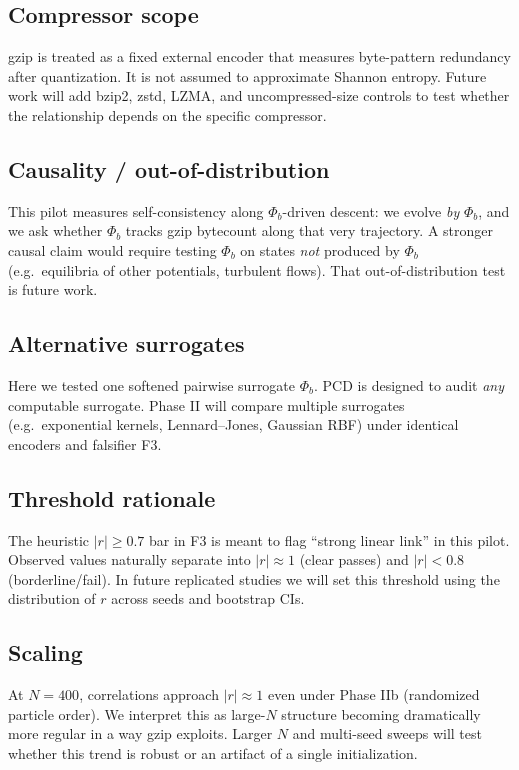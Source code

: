 \documentclass[11pt,a4paper]{article}
\newcommand{\phib}{\Phi_b}
\begin{document}
\subsection*{Compressor scope}
gzip is treated as a fixed external encoder that measures byte-pattern redundancy after quantization. It is not assumed to approximate Shannon entropy. Future work will add bzip2, zstd, LZMA, and uncompressed-size controls to test whether the relationship depends on the specific compressor.

\subsection*{Causality / out-of-distribution}
This pilot measures self-consistency along $\phib$-driven descent: we evolve \emph{by} $\phib$, and we ask whether $\phib$ tracks gzip bytecount along that very trajectory. A stronger causal claim would require testing $\phib$ on states \emph{not} produced by $\phib$ (e.g.\ equilibria of other potentials, turbulent flows). That out-of-distribution test is future work.

\subsection*{Alternative surrogates}
Here we tested one softened pairwise surrogate $\phib$. PCD is designed to audit \emph{any} computable surrogate. Phase II will compare multiple surrogates (e.g.\ exponential kernels, Lennard--Jones, Gaussian RBF) under identical encoders and falsifier F3.

\subsection*{Threshold rationale}
The heuristic $|r|\ge0.7$ bar in F3 is meant to flag ``strong linear link'' in this pilot. Observed values naturally separate into $|r|\approx 1$ (clear passes) and $|r|<0.8$ (borderline/fail). In future replicated studies we will set this threshold using the distribution of $r$ across seeds and bootstrap CIs.

\subsection*{Scaling}
At $N{=}400$, correlations approach $|r|\approx 1$ even under Phase IIb (randomized particle order). We interpret this as large-$N$ structure becoming dramatically more regular in a way gzip exploits. Larger $N$ and multi-seed sweeps will test whether this trend is robust or an artifact of a single initialization.
\end{document}

